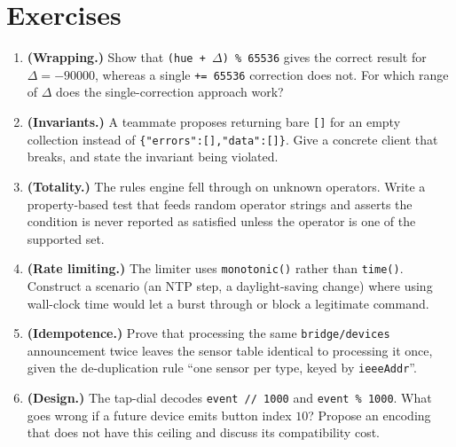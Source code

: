 \documentclass[11pt,a4paper]{article}
\newcommand{\code}[1]{\texttt{#1}}
\begin{document}
\section*{Exercises}
\begin{enumerate}[leftmargin=2em]
  \item \textbf{(Wrapping.)} Show that \code{(hue + }$\Delta$\code{) \% 65536}
        gives the correct result for $\Delta = -90000$, whereas a single
        \code{+= 65536} correction does not. For which range of $\Delta$ does
        the single-correction approach work?
  \item \textbf{(Invariants.)} A teammate proposes returning bare \code{[]} for
        an empty collection instead of \code{\{"errors":[],"data":[]\}}.
        Give a concrete client that breaks, and state the invariant being
        violated.
  \item \textbf{(Totality.)} The rules engine fell through on unknown operators.
        Write a property-based test that feeds random operator strings and
        asserts the condition is never reported as satisfied unless the operator
        is one of the supported set.
  \item \textbf{(Rate limiting.)} The limiter uses \code{monotonic()} rather
        than \code{time()}. Construct a scenario (an NTP step, a daylight-saving
        change) where using wall-clock time would let a burst through or block a
        legitimate command.
  \item \textbf{(Idempotence.)} Prove that processing the same
        \code{bridge/devices} announcement twice leaves the sensor table
        identical to processing it once, given the de-duplication rule
        ``one sensor per type, keyed by \code{ieeeAddr}''.
  \item \textbf{(Design.)} The tap-dial decodes \code{event // 1000} and
        \code{event \% 1000}. What goes wrong if a future device emits button
        index $10$? Propose an encoding that does not have this ceiling and
        discuss its compatibility cost.
\end{enumerate}
\end{document}
